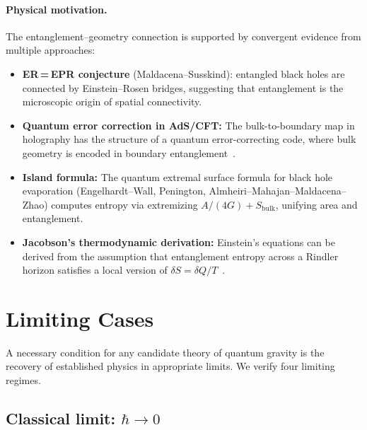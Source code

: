 \documentclass[12pt,a4paper]{article}
\theoremstyle{postulate}
\begin{document}
\paragraph{Physical motivation.}
The entanglement--geometry connection is supported by convergent evidence
from multiple approaches:
\begin{itemize}
  \item \textbf{ER\,=\,EPR conjecture} (Maldacena--Susskind): entangled
        black holes are connected by Einstein--Rosen bridges, suggesting
        that entanglement is the microscopic origin of spatial connectivity.
  \item \textbf{Quantum error correction in AdS/CFT:}\quad
        The bulk-to-boundary map in holography has the structure of a quantum
        error-correcting code, where bulk geometry is encoded in boundary
        entanglement~\cite{Almheiri2015}.
  \item \textbf{Island formula:}\quad
        The quantum extremal surface formula for black hole evaporation
        (Engelhardt--Wall, Penington, Almheiri--Mahajan--Maldacena--Zhao)
        computes entropy via extremizing $A/(4G) + S_{\mathrm{bulk}}$,
        unifying area and entanglement.
  \item \textbf{Jacobson's thermodynamic derivation:}\quad
        Einstein's equations can be derived from the assumption that
        entanglement entropy across a Rindler horizon satisfies a local
        version of $\delta S = \delta Q/T$~\cite{Jacobson1995}.
\end{itemize}


\section{Limiting Cases}\label{sec:limits}

A necessary condition for any candidate theory of quantum gravity is the
recovery of established physics in appropriate limits.  We verify four
limiting regimes.

\subsection{Classical limit: $\hbar \to 0$}
\end{document}
